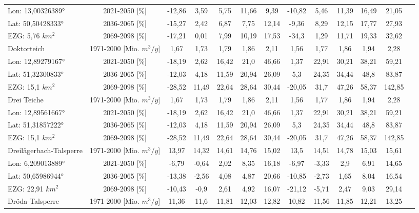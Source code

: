 \begin{longtable}{@{\extracolsep{\fill}}lc|ccccc||cccccc}
\cline{2-13} 
Lon: 13,00326389° & 2021-2050 [\%]  & -12,86 & 3,59 & 5,75 & 11,66 & 9,39 & -10,82 & 5,46 & 11,39 & 16,49 & 21,05 & \\ 
Lat: 50,50428333° & 2036-2065 [\%]  & -15,27 & 2,42 & 6,87 & 7,75 & 12,14 & -9,36 & 8,29 & 12,15 & 17,77 & 27,93 & \\ 
EZG: 5,76 $km^2$ & 2069-2098 [\%]  & -17,21 & 0,01 & 7,99 & 10,19 & 17,53 & -34,3 & 1,29 & 11,71 & 19,33 & 32,62 & \\ 
\hline 
Doktorteich & 1971-2000 [Mio. $m^3/y$]  & 1,67 & 1,73 & 1,79 & 1,86 & 2,11 & 1,56 & 1,77 & 1,86 & 1,94 & 2,28 & \\ 
\cline{2-13} 
Lon: 12,89279167° & 2021-2050 [\%]  & -18,19 & 2,62 & 16,42 & 21,0 & 46,66 & 1,37 & 22,91 & 30,21 & 38,21 & 59,21 & \\ 
Lat: 51,32300833° & 2036-2065 [\%]  & -12,03 & 4,18 & 11,59 & 20,94 & 26,09 & 5,3 & 24,35 & 34,44 & 48,8 & 83,87 & \\ 
EZG: 15,1 $km^2$ & 2069-2098 [\%]  & -28,52 & 11,49 & 22,64 & 28,64 & 30,44 & -20,05 & 31,7 & 47,26 & 58,37 & 142,85 & \\ 
\hline 
Drei Teiche & 1971-2000 [Mio. $m^3/y$]  & 1,67 & 1,73 & 1,79 & 1,86 & 2,11 & 1,56 & 1,77 & 1,86 & 1,94 & 2,28 & \\ 
\cline{2-13} 
Lon: 12,89561667° & 2021-2050 [\%]  & -18,19 & 2,62 & 16,42 & 21,0 & 46,66 & 1,37 & 22,91 & 30,21 & 38,21 & 59,21 & \\ 
Lat: 51,31857222° & 2036-2065 [\%]  & -12,03 & 4,18 & 11,59 & 20,94 & 26,09 & 5,3 & 24,35 & 34,44 & 48,8 & 83,87 & \\ 
EZG: 15,1 $km^2$ & 2069-2098 [\%]  & -28,52 & 11,49 & 22,64 & 28,64 & 30,44 & -20,05 & 31,7 & 47,26 & 58,37 & 142,85 & \\ 
\hline 
Dreilägerbach-Talsperre & 1971-2000 [Mio. $m^3/y$]  & 13,97 & 14,32 & 14,61 & 14,76 & 15,02 & 13,5 & 14,51 & 14,78 & 15,03 & 15,61 & \\ 
\cline{2-13} 
Lon: 6,209013889° & 2021-2050 [\%]  & -6,79 & -0,64 & 2,02 & 8,35 & 16,18 & -6,97 & -3,33 & 2,9 & 6,91 & 14,65 & \\ 
Lat: 50,65986944° & 2036-2065 [\%]  & -13,38 & -2,56 & 4,08 & 4,87 & 20,66 & -10,85 & -2,73 & 1,65 & 8,04 & 16,54 & \\ 
EZG: 22,91 $km^2$ & 2069-2098 [\%]  & -10,43 & -0,9 & 2,61 & 4,92 & 16,07 & -21,12 & -5,71 & 2,47 & 9,03 & 29,14 & \\ 
\hline 
Dröda-Talsperre & 1971-2000 [Mio. $m^3/y$]  & 11,36 & 11,6 & 11,81 & 12,03 & 12,82 & 10,82 & 11,56 & 11,85 & 12,21 & 13,25 & \\ 

\end{longtable}
